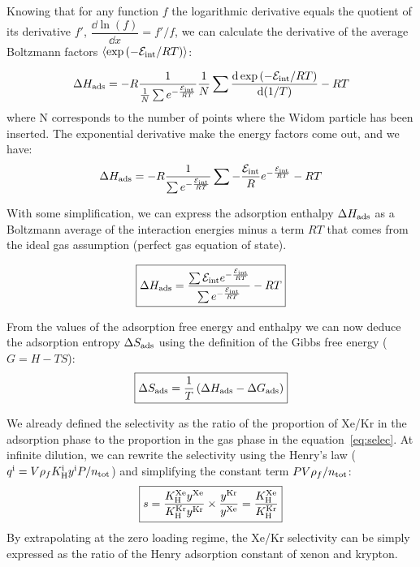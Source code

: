 \documentclass[main.tex]{subfiles}
\begin{document}
Knowing that for any function $f$ the logarithmic derivative equals the quotient of its derivative $f'$, $\dfrac{\dd \ln\left(f\right)}{\dd x}=f'/f$, we can calculate the derivative of the average Boltzmann factors $\langle \exp\left(-\mathcal{E}_{\text{int}}/RT\right) \rangle$:

\begin{equation}
  \Delta H_{\text{ads}} = -R\dfrac{1}{\frac{1}{N}\sum e^{-\frac{\mathcal{E}_{\text{int}}}{RT}}} \frac{1}{N}\sum \dfrac{\mathop{}\mathopen{}\mathrm{d} \exp\left(-\mathcal{E}_{\text{int}}/RT\right)}{\mathop{}\mathopen{}\mathrm{d} (1/T)} - RT
\end{equation}
where N corresponds to the number of points where the Widom particle has been inserted.
The exponential derivative make the energy factors come out, and we have:
\begin{equation}
  \Delta H_{\text{ads}} = -R\dfrac{1}{\sum e^{-\frac{\mathcal{E}_{\text{int}}}{RT}}} \sum - \frac{\mathcal{E}_{\text{int}}}{R} e^{-\frac{\mathcal{E}_{\text{int}}}{RT}} - RT
\end{equation}

With some simplification, we can express the adsorption enthalpy $\Delta H_{\text{ads}}$ as a Boltzmann average of the interaction energies minus a term $RT$ that comes from the ideal gas assumption (perfect gas equation of state).

\begin{equation}\label{eq:ads_enthalpy}
  \boxed{
  \Delta H_{\text{ads}} = \dfrac{\sum \mathcal{E}_{\text{int}}e^{-\frac{\mathcal{E}_{\text{int}}}{RT}}}{\sum e^{-\frac{\mathcal{E}_{\text{int}}}{RT}}} - RT
  }
\end{equation}

From the values of the adsorption free energy and enthalpy we can now deduce the adsorption entropy $\Delta S_{\text{ads}}$ using the definition of the Gibbs free energy ($G = H-TS$):
\begin{equation}\label{eq:ads_entropy}
  \boxed{
  \Delta S_{\text{ads}} = \dfrac{1}{T} \left(\Delta H_{\text{ads}} - \Delta G_{\text{ads}} \right)
  }
\end{equation}

We already defined the selectivity as the ratio of the proportion of Xe/Kr in the adsorption phase to the proportion in the gas phase in the equation~\ref{eq:selec}. At infinite dilution, we can rewrite the selectivity using the Henry's law ($q^{\text{i}}=V\rho_fK_{\text{H}}^{\text{i}}y^{\text{i}}P/n_{\text{tot}}$) and simplifying the constant term $PV\rho_f/n_{\text{tot}}$:
\begin{equation}\label{eq:selec_0}
  \boxed{
  s = \dfrac{K_{\text{H}}^{\text{Xe}}y^{\text{Xe}}}{K_{\text{H}}^{\text{Kr}}y^{\text{Kr}}}\times\dfrac{y^{\text{Kr}}}{y^{\text{Xe}}} = \dfrac{K_{\text{H}}^{\text{Xe}}}{K_{\text{H}}^{\text{Kr}}}
  }
\end{equation}
By extrapolating at the zero loading regime, the Xe/Kr selectivity can be simply expressed as the ratio of the Henry adsorption constant of xenon and krypton.
\end{document}
